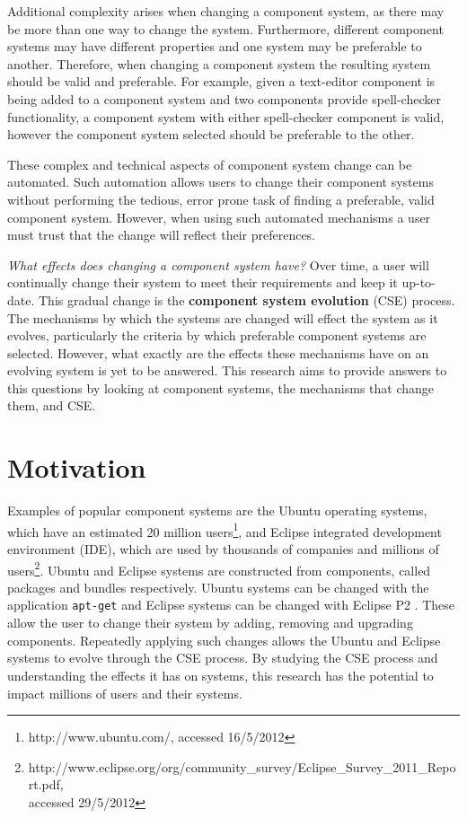 Additional complexity arises when changing a component system,
as there may be more than one way to change the system.
Furthermore, different component systems may have different properties and one system may be preferable to another.
Therefore, when changing a component system the resulting system should be valid and preferable.  
For example, given a text-editor component is being added to a component system and two components provide spell-checker functionality, 
a component system with either spell-checker component is valid, however the component system selected should be preferable to the other.

These complex and technical aspects of component system change can be automated. 
Such automation allows users to change their component systems without performing the tedious, error prone task of finding a preferable, valid component system.
However, when using such automated mechanisms a user must trust that the change will reflect their preferences.


\textit{What effects does changing a component system have?}
Over time, a user will continually change their system to meet their requirements and keep it up-to-date.
This gradual change is the \textbf{component system evolution} (CSE) process.
The mechanisms by which the systems are changed will effect the system as it evolves,
particularly the criteria by which preferable component systems are selected.
However, what exactly are the effects these mechanisms have on an evolving system is yet to be answered. 
This research aims to provide answers to this questions by looking at component systems, the mechanisms that change them, and CSE.

\section{Motivation}
Examples of popular component systems are the Ubuntu operating systems, which have an estimated 20 million users\footnote{http://www.ubuntu.com/, accessed 16/5/2012},
and Eclipse integrated development environment (IDE), which are used by thousands of companies and millions of users\footnote{http://www.eclipse.org/org/community\_survey/Eclipse\_Survey\_2011\_Report.pdf, \\accessed 29/5/2012}.
Ubuntu and Eclipse systems are constructed from components, called packages and bundles respectively. 
Ubuntu systems can be changed with the application \texttt{apt-get} \citep{Barth2005} and Eclipse systems can be changed with Eclipse P2 \citep{leBerre2010}.
These allow the user to change their system by adding, removing and upgrading components.
Repeatedly applying such changes allows the Ubuntu and Eclipse systems to evolve through the CSE process.
By studying the CSE process and understanding the effects it has on systems, this research has the potential to impact millions of users and their systems.

